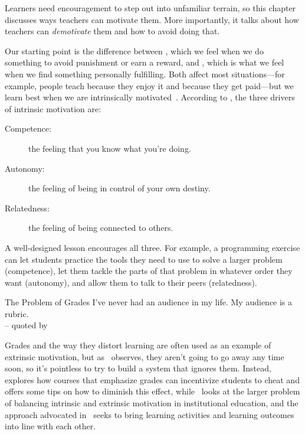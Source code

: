 
Learners need encouragement to step out into unfamiliar terrain,
so this chapter discusses ways teachers can motivate them.
More importantly,
it talks about how teachers can \emph{demotivate} them
and how to avoid doing that.

Our starting point is the difference between
,
which we feel when we do something to avoid punishment or earn a reward,
and ,
which is what we feel when we find something personally fulfilling.
Both affect most situations---for example,
people teach because they enjoy it and because they get paid---but
we learn best when we are intrinsically motivated~\cite{Wlod2017}.
According to ,
the three drivers of intrinsic motivation are:

\begin{description}

\item[Competence:]
  the feeling that you know what you're doing.

\item[Autonomy:]
  the feeling of being in control of your own destiny.

\item[Relatedness:]
  the feeling of being connected to others.

\end{description}

A well-designed lesson encourages all three.
For example,
a programming exercise can
let students practice the tools they need to use to solve a larger problem (competence),
let them tackle the parts of that problem in whatever order they want (autonomy),
and allow them to talk to their peers (relatedness).

\begin{aside}{The Problem of Grades}
  I've never had an audience in my life. My audience is a rubric.\\
  -- quoted by 

  Grades and the way they distort learning are often used as an example of extrinsic motivation,
  but as~\cite{Mill2016a} observes,
  they aren't going to go away any time soon,
  so it's pointless to try to build a system that ignores them.
  Instead,~\cite{Lang2013} explores how courses that emphasize grades
  can incentivize students to cheat
  and offers some tips on how to diminish this effect,
  while~\cite{Covi2017} looks at the larger problem of
  balancing intrinsic and extrinsic motivation in institutional education,
  and the  approach
  advocated in~\cite{Bigg2011} seeks to bring learning activities and learning outcomes
  into line with each other.
\end{aside}

